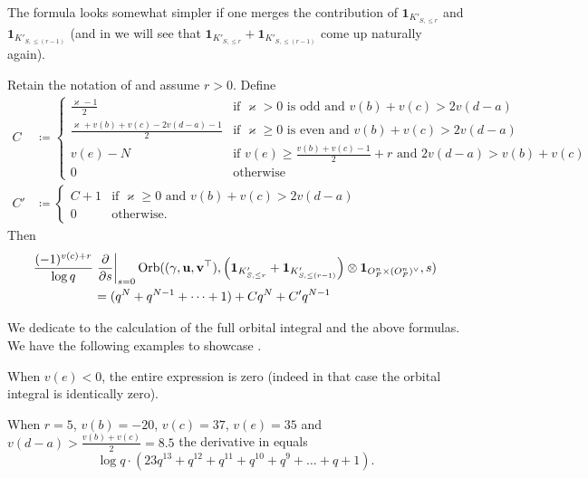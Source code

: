 The formula looks somewhat simpler if one merges the contribution of
$\mathbf{1}_{K'_{S, \le r}}$ and $\mathbf{1}_{K'_{S, \le (r-1)}}$
(and in  we will see that
$\mathbf{1}_{K'_{S, \le r}} + \mathbf{1}_{K'_{S, \le (r-1)}}$
come up naturally again).
\begin{corollary}
  \label{cor:semi_lie_combo}
  Retain the notation of  and assume $r > 0$.
  Define
  \begin{align*}
    C &\coloneqq
    \begin{cases}
      \frac{\varkappa-1}{2}
        & \text{if } \varkappa > 0 \text{ is odd}
          \text{ and } v(b) + v(c) > 2v(d-a)  \\
      \frac{\varkappa+v(b)+v(c)-2v(d-a)-1}{2}
        & \text{if } \varkappa \ge 0 \text{ is even}
          \text{ and } v(b) + v(c) > 2v(d-a)  \\
      v(e) - N
        & \text{if } v(e) \ge \frac{v(b)+v(c)-1}{2} + r
        \text{ and } 2v(d-a) > v(b) + v(c) \\
      0 & \text{otherwise}
    \end{cases} \\
    C' &\coloneqq
    \begin{cases}
      C + 1 & \text{if } \varkappa \ge 0 \text{ and } v(b)+v(c) > 2v(d-a) \\
      0 & \text{otherwise}.
    \end{cases}
  \end{align*}
  Then
  \begin{align*}
    \frac{(-1)^{v(c)+r}}{\log q} &\left. \pdv{}{s} \right\rvert_{s=0}
    \operatorname{Orb}({(\gamma, \mathbf u, \mathbf v^\top)}, \left(\mathbf{1}_{K'_{S, \le r}} + \mathbf{1}_{K'_{S, \le (r-1)}}\right) \otimes \mathbf{1}_{O_F^n \times (O_F^n)^\vee}, s) \\
    &= (q^N + q^{N-1} + \dots + 1) + C q^N + C' q^{N-1}
  \end{align*}
\end{corollary}

We dedicate  to the calculation
of the full orbital integral and the above formulas.
We have the following examples to showcase .

\begin{example}
  When $v(e) < 0$, the entire expression is zero
  (indeed in that case the orbital integral is identically zero).
\end{example}

\begin{example}
  When $r=5$, $v(b) = -20$, $v(c) = 37$, $v(e) = 35$ and $v(d-a) > \frac{v(b)+v(c)}{2} = 8.5$
  the derivative in  equals
  \[ \log q \cdot (23q^{13} + q^{12} + q^{11} + q^{10} + q^9 + \dots + q + 1). \]
\end{example}


